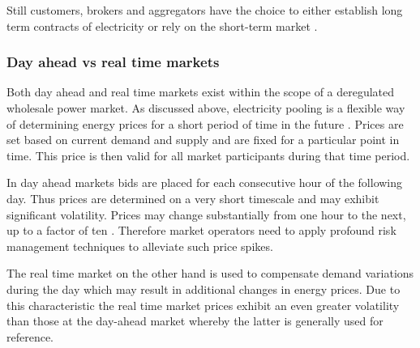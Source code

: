 Still customers, brokers and aggregators have the choice to either establish long term contracts of electricity or rely on the short-term market \cite{hogan1997reshaping}.







\subsubsection{Day ahead vs real time markets}

Both day ahead and real time markets exist within the scope of a deregulated wholesale power market. As discussed above, electricity pooling is a flexible way of determining energy prices for a short period of time in the future \cite{hogan1997reshaping}. Prices are set based on current demand and supply and are fixed for a particular point in time. This price is then valid for all market participants during that time period. 

In day ahead markets bids are placed for each consecutive hour of the following day. Thus prices are determined on a very short timescale and may exhibit significant volatility. Prices may change substantially from one hour to the next, up to a factor of ten \cite{huisman2007hourly}. Therefore market operators need to apply profound risk management techniques to alleviate such price spikes. 

The real time market on the other hand is used to compensate demand variations during the day which may result in additional changes in energy prices. 
Due to this characteristic the real time market prices exhibit an even greater volatility than those at the day-ahead market whereby the latter is generally used for reference. 



